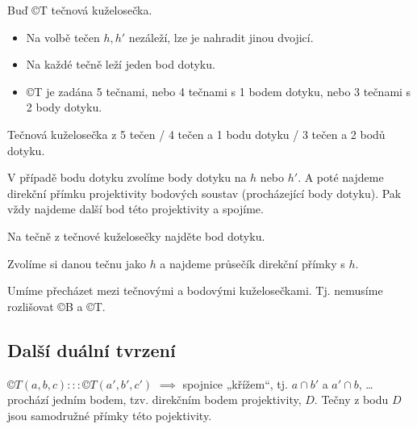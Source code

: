 \documentclass[12pt]{article}					%
\begin{document}
\begin{veta}
	Buď ©T tečnová kuželosečka.

	\begin{itemize}
		\item Na volbě tečen $h, h'$ nezáleží, lze je nahradit jinou dvojicí.
		\item Na každé tečně leží jeden bod dotyku.
		\item ©T je zadána 5 tečnami, nebo 4 tečnami s 1 bodem dotyku, nebo 3 tečnami s 2 body dotyku.
	\end{itemize}
\end{veta}

\begin{priklad}[Konstrukce]
	Tečnová kuželosečka z 5 tečen / 4 tečen a 1 bodu dotyku / 3 tečen a 2 bodů dotyku.

	\begin{reseni}
		V případě bodu dotyku zvolíme body dotyku na $h$ nebo $h'$. A poté najdeme direkční přímku projektivity bodových soustav (procházející body dotyku). Pak vždy najdeme další bod této projektivity a spojíme.
	\end{reseni}
\end{priklad}

\begin{priklad}[Konstrukce]
	Na tečně z tečnové kuželosečky najděte bod dotyku.

	\begin{reseni}
		Zvolíme si danou tečnu jako $h$ a najdeme průsečík direkční přímky s $h$.
	\end{reseni}
\end{priklad}

\begin{dusledek}
	Umíme přecházet mezi tečnovými a bodovými kuželosečkami. Tj. nemusíme rozlišovat ©B a ©T.
\end{dusledek}

\subsection{Další duální tvrzení}
\begin{veta}
	$©T(a, b, c):::©T(a', b', c')$ $\implies$ spojnice „křížem“, tj. $a \cap b'$ a $a' \cap b$, … prochází jedním bodem, tzv. direkčním bodem projektivity, $D$. Tečny z bodu $D$ jsou samodružné přímky této pojektivity.
\end{veta}
\end{document}
